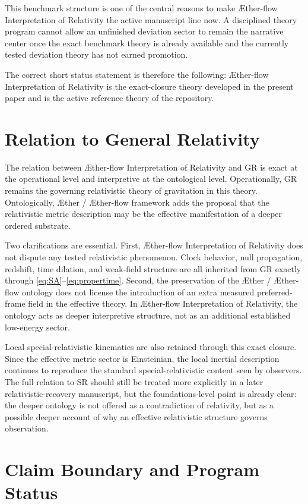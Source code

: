 \documentclass[11pt]{article}
\newcommand{\Aether}{\AE{}ther}
\newcommand{\Aflow}{\AE{}ther-flow}
\newcommand{\TheoryName}{\Aflow{} Interpretation of Relativity}
\newcommand{\TheoryProgram}{\Aether{} / \Aflow{} framework}
\begin{document}
This benchmark structure is one of the central reasons to make \TheoryName{} the active manuscript line now. A disciplined theory program cannot allow an unfinished deviation sector to remain the narrative center once the exact benchmark theory is already available and the currently tested deviation theory has not earned promotion.

The correct short status statement is therefore the following: \TheoryName{} is the exact-closure theory developed in the present paper and is the active reference theory of the repository.

\section{Relation to General Relativity}

The relation between \TheoryName{} and GR is exact at the operational level and interpretive at the ontological level. Operationally, GR remains the governing relativistic theory of gravitation in this theory. Ontologically, \TheoryProgram{} adds the proposal that the relativistic metric description may be the effective manifestation of a deeper ordered substrate.

Two clarifications are essential. First, \TheoryName{} does not dispute any tested relativistic phenomenon. Clock behavior, null propagation, redshift, time dilation, and weak-field structure are all inherited from GR exactly through \eqref{eq:SA}--\eqref{eq:propertime}. Second, the preservation of the \Aether{} / \Aflow{} ontology does not license the introduction of an extra measured preferred-frame field in the effective theory. In \TheoryName{}, the ontology acts as deeper interpretive structure, not as an additional established low-energy sector.

Local special-relativistic kinematics are also retained through this exact closure. Since the effective metric sector is Einsteinian, the local inertial description continues to reproduce the standard special-relativistic content seen by observers. The full relation to SR should still be treated more explicitly in a later relativistic-recovery manuscript, but the foundations-level point is already clear: the deeper ontology is not offered as a contradiction of relativity, but as a possible deeper account of why an effective relativistic structure governs observation.

\section{Claim Boundary and Program Status}
\end{document}
